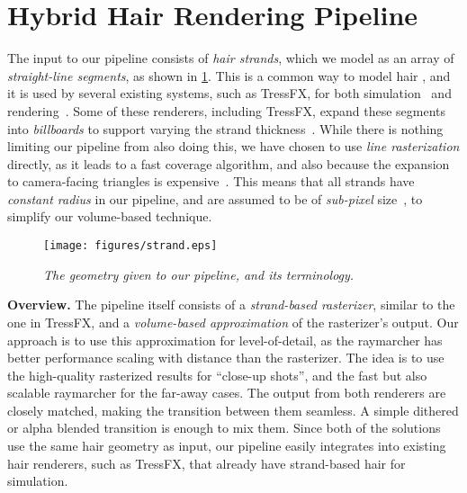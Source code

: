 \documentclass{egpubl}
\begin{document}


\newpage

\section{Hybrid Hair Rendering Pipeline} \label{sec:hybrid_hair_rendering_pipeline}


The input to our pipeline consists of \emph{hair strands}, which we model as an array of \emph{straight-line segments}, as shown in \cref{fig:strand}. This is a common way to model hair \cite{ward2007survey}, and it is used by several existing systems, such as TressFX, for both simulation~\cite{han2014hair} and rendering~\cite{martin2014tressfx}. Some of these renderers, including TressFX, expand these segments into \emph{billboards} to support varying the strand thickness~\cite{yuksel2010advanced}. While there is nothing limiting our pipeline from also doing this, we have chosen to use \emph{line rasterization} directly, as it leads to a fast coverage algorithm, and also because the expansion to camera-facing triangles is expensive~\cite{yuksel2010advanced}. This means that all strands have \emph{constant radius} in our pipeline, and are assumed to be of \emph{sub-pixel} size~\cite{leblanc1991rendering}, to simplify our volume-based technique.

\begin{figure}[htb]
    \centering
    \texttt{[image: figures/strand.eps]}
    \caption{\emph{The geometry given to our pipeline, and its terminology.}}
    \label{fig:strand}
    \vspace{-2mm}
\end{figure}


\noindent \textbf{Overview. } The pipeline itself consists of a \emph{strand-based rasterizer}, similar to the one in TressFX, and a \emph{volume-based approximation} of the rasterizer's output. Our approach is to use this approximation for level-of-detail, as the raymarcher has better performance scaling with distance than the rasterizer. The idea is to use the high-quality rasterized results for ``close-up shots'', and the fast but also scalable raymarcher for the far-away cases. The output from both renderers are closely matched, making the transition between them seamless. A simple dithered or alpha blended transition is enough to mix them. Since both of the solutions use the same hair geometry as input, our pipeline easily integrates into existing hair renderers, such as TressFX, that already have strand-based hair for simulation.
\end{document}
